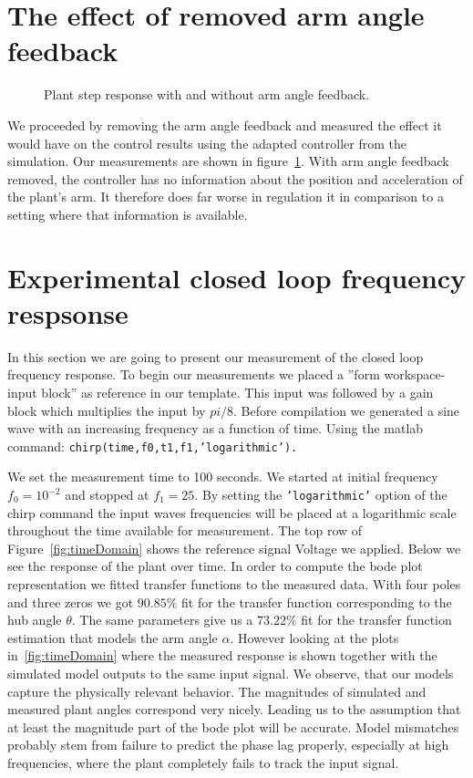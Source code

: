 \documentclass[ twoside,openright,titlepage,numbers=noenddot,headinclude,%
                footinclude=true,cleardoublepage=empty,abstractoff, %
                BCOR=5mm,paper=a4,fontsize=11pt,%
                ngerman,american,%
                ]{scrreprt}
\begin{document}
{{\section{The effect of removed arm angle feedback}
\begin{figure}

\caption{Plant step response with and without arm angle feedback.}
\label{fig:alphaNoAlpha}
\end{figure}
We proceeded by removing the arm angle feedback and measured the effect it would have on the control results using the adapted controller from the simulation. Our measurements are shown in figure~\ref{fig:alphaNoAlpha}. With arm angle feedback removed, the controller has no information about the position and acceleration of the plant's arm. It therefore does far worse in regulation it in comparison to a setting where that information is available. 

\section{Experimental closed loop frequency respsonse}
In this section we are going to present our measurement of the closed loop frequency response. To begin our measurements we placed a ''form workspace-input block'' as reference in our template.  This input was followed by a gain block which multiplies the input by $pi/8$. Before compilation we generated a sine wave with an increasing frequency as a function of time. Using the matlab command: \texttt{chirp(time,f0,t1,f1}\texttt{,'logarithmic').}} We set the measurement time to 100 seconds. We started at initial frequency $f_0 = 10^{-2}$ and stopped at $f_1 = 25$. By setting the \texttt{'logarithmic'} option of the chirp command the input waves frequencies will be placed at a logarithmic scale throughout the time available for measurement. The top row of Figure~\ref{fig:timeDomain} shows the reference signal Voltage we applied. Below we see the response of the plant over time. In order to compute the bode plot representation we fitted transfer functions to the measured data. With four poles and three zeros we got $90.85\%$ fit for the transfer function corresponding to the hub angle $\theta$. The same parameters give us a $73.22\%$ fit for the transfer function estimation that models the arm angle $\alpha$. However looking at the plots in~\ref{fig:timeDomain} where the measured response is shown together with the simulated model outputs to the same input signal. We observe, that our models capture the physically relevant behavior. The magnitudes of simulated and measured plant angles correspond very nicely. Leading us to the assumption that at least the magnitude part of the bode plot will be accurate. Model mismatches probably stem from failure to predict the phase lag properly, especially at high frequencies, where the plant completely fails to track the input signal.
 
}
\end{document}
